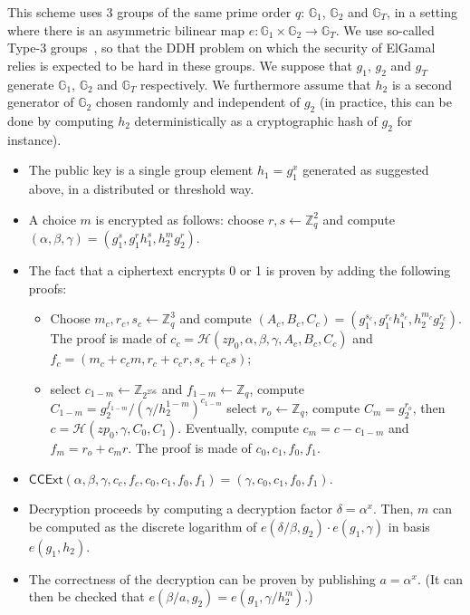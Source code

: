 \documentclass[prodmode]{acmsmall}
\newcommand{\zp}{\ensuremath{zp}\xspace}
\newcommand{\CCExt}[1]{\textsf{CCExt}(#1)\xspace} %
\newcommand{\hash}{\ensuremath{\mathcal{H}}\xspace} %
\newcommand{\G}{\ensuremath{\mathbb{G}}\xspace} %
\begin{document}
This scheme uses 3 groups of the same prime order $q$: $\G_1$, $\G_2$
and $\G_T$, in a setting where there is an asymmetric bilinear map $e:
\G_1 \times \G_2 \rightarrow \G_T$. We use so-called Type-3
groups~\cite{GPS08}, so that the DDH problem on which the security of
ElGamal relies is expected to be hard in these groups. We suppose that
$g_1$, $g_2$ and $g_T$ generate $\G_1$, $\G_2$ and $\G_T$
respectively. We furthermore assume that $h_2$ is a second generator
of $\G_2$ chosen randomly and independent of $g_2$ (in practice, this
can be done by computing $h_2$ deterministically as a cryptographic
hash of $g_2$ for instance).

\begin{itemize}
\item The public key is a single group element $h_1 = g_1^x$
  generated as suggested above, in a distributed or threshold way.
\item A choice $m$ is encrypted as follows: choose $r, s \leftarrow
  \mathbb{Z}^2_q$ and compute $(\alpha, \beta, \gamma) = (g_1^s,
  g_1^rh_1^s, h_2^mg_2^r)$.

\item The fact that a ciphertext encrypts 0 or 1 is proven by adding
the following proofs: 
\begin{itemize}
\item Choose $m_c, r_c, s_c \leftarrow \mathbb{Z}^3_q$ and compute
  $(A_c, B_c, C_c) = (g_1^{s_c}, g_1^{r_c}h_1^{s_c},
  h_2^{m_c}g_2^{r_c})$. The proof is made of $c_c = \hash(\zp_0, \alpha, \beta,
  \gamma, A_c, B_c, C_c)$ and $f_c = (m_c + c_cm, r_c + c_cr, s_c +
  c_cs)$;
\item select $c_{1-m} \leftarrow \mathbb{Z}_{2^{256}}$ and $f_{1-m}
  \leftarrow \mathbb{Z}_q$, compute $C_{1-m} =
  g_2^{f_{1-m}}/(\gamma/h_2^{1-m})^{c_{1-m}}$ select $r_o \leftarrow
  \mathbb{Z}_q$, compute $C_m = g_2^{r_o}$, then $c =
  \hash(\zp_0, \gamma, C_0, C_1)$. Eventually, compute $c_m = c
  - c_{1-m}$ and $f_m = r_o + c_mr$. The proof is made of $c_0, c_1,
  f_0, f_1$.
\end{itemize}

\item $\CCExt{\alpha, \beta, \gamma, c_c, f_c, c_0, c_1, f_0, f_1} =
  (\gamma, c_0, c_1, f_0, f_1)$.

\item Decryption proceeds by computing a decryption factor $\delta =
\alpha^x$. Then, $m$ can be computed as the discrete logarithm of
$e(\delta/\beta, g_2) \cdot e(g_1, \gamma)$ in basis $e(g_1,h_2)$.
\item The correctness of the decryption can be proven by publishing
  $a = \alpha^x$. (It can then be checked that $e(\beta/a, g_2) = e(g_1, \gamma/h_2^m)$.) 
\end{itemize}
\end{document}

